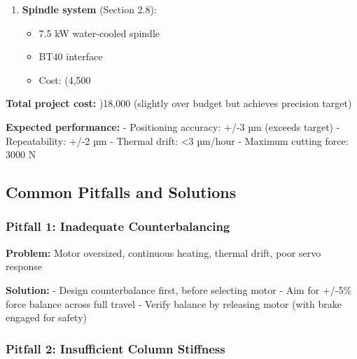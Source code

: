 \documentclass[
]{article}
\providecommand{\tightlist}{%
  \setlength{\itemsep}{0pt}\setlength{\parskip}{0pt}}
\begin{document}
\begin{enumerate}
  \begin{itemize}
  \tightlist
  \item
    Column coolant circulation
  \item
    Spindle chiller with precision control
  \item
    Temperature sensors and compensation
  \item
    Cost: )3,000
  \end{itemize}
\item
  \textbf{Spindle system} (Section 2.8):

  \begin{itemize}
  \tightlist
  \item
    7.5 kW water-cooled spindle
  \item
    BT40 interface
  \item
    Cost: (4,500
  \end{itemize}
\end{enumerate}

\textbf{Total project cost:} )18,000 (slightly over budget but achieves
precision target)

\textbf{Expected performance:} - Positioning accuracy: +/-3 µm (exceeds
target) - Repeatability: +/-2 µm - Thermal drift: \textless3 µm/hour -
Maximum cutting force: 3000 N

\subsection{Common Pitfalls and
Solutions}\label{common-pitfalls-and-solutions}

\subsubsection{Pitfall 1: Inadequate
Counterbalancing}\label{pitfall-1-inadequate-counterbalancing}

\textbf{Problem:} Motor oversized, continuous heating, thermal drift,
poor servo response

\textbf{Solution:} - Design counterbalance first, before selecting motor
- Aim for +/-5\% force balance across full travel - Verify balance by
releasing motor (with brake engaged for safety)

\subsubsection{Pitfall 2: Insufficient Column
Stiffness}\label{pitfall-2-insufficient-column-stiffness}
\end{document}
